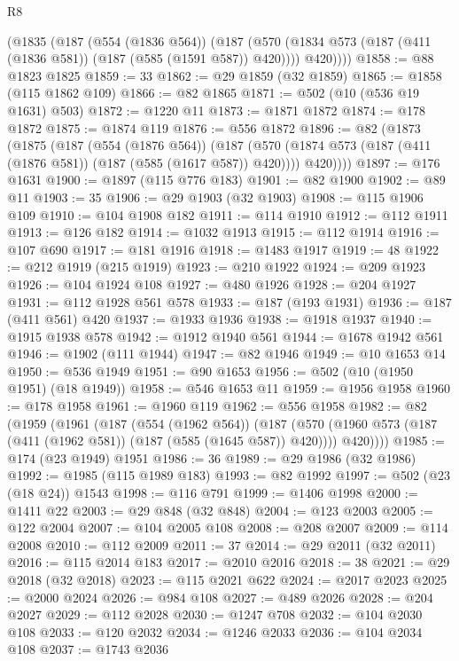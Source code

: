 \begin{lexlean}{R8}
\begin{coremodule}
      (@1835
        (@187
          (@554 (@1836 @564))
          (@187
            (@570 (@1834 @573 (@187 (@411 (@1836 @581)) (@187 (@585 (@1591 @587)) @420))))
            @420))))
@1858 := @88 @1823 @1825
@1859 := 33
@1862 := @29 @1859 (@32 @1859)
@1865 := @1858 (@115 @1862 @109)
@1866 := @82 @1865
@1871 := @502 (@10 (@536 @19 @1631) @503)
@1872 := @1220 @11
@1873 := @1871 @1872
@1874 := @178 @1872
@1875 := @1874 @119
@1876 := @556 @1872
@1896 := @82
    (@1873
      (@1875
        (@187
          (@554 (@1876 @564))
          (@187
            (@570 (@1874 @573 (@187 (@411 (@1876 @581)) (@187 (@585 (@1617 @587)) @420))))
            @420))))
@1897 := @176 @1631
@1900 := @1897 (@115 @776 @183)
@1901 := @82 @1900
@1902 := @89 @11
@1903 := 35
@1906 := @29 @1903 (@32 @1903)
@1908 := @115 @1906 @109
@1910 := @104 @1908 @182
@1911 := @114 @1910
@1912 := @112 @1911
@1913 := @126 @182
@1914 := @1032 @1913
@1915 := @112 @1914
@1916 := @107 @690
@1917 := @181 @1916
@1918 := @1483 @1917
@1919 := 48
@1922 := @212 @1919 (@215 @1919)
@1923 := @210 @1922
@1924 := @209 @1923
@1926 := @104 @1924 @108
@1927 := @480 @1926
@1928 := @204 @1927
@1931 := @112 @1928 @561 @578
@1933 := @187 (@193 @1931)
@1936 := @187 (@411 @561) @420
@1937 := @1933 @1936
@1938 := @1918 @1937
@1940 := @1915 @1938 @578
@1942 := @1912 @1940 @561
@1944 := @1678 @1942 @561
@1946 := @1902 (@111 @1944)
@1947 := @82 @1946
@1949 := @10 @1653 @14
@1950 := @536 @1949
@1951 := @90 @1653
@1956 := @502 (@10 (@1950 @1951) (@18 @1949))
@1958 := @546 @1653 @11
@1959 := @1956 @1958
@1960 := @178 @1958
@1961 := @1960 @119
@1962 := @556 @1958
@1982 := @82
    (@1959
      (@1961
        (@187
          (@554 (@1962 @564))
          (@187
            (@570 (@1960 @573 (@187 (@411 (@1962 @581)) (@187 (@585 (@1645 @587)) @420))))
            @420))))
@1985 := @174 (@23 @1949) @1951
@1986 := 36
@1989 := @29 @1986 (@32 @1986)
@1992 := @1985 (@115 @1989 @183)
@1993 := @82 @1992
@1997 := @502 (@23 (@18 @24)) @1543
@1998 := @116 @791
@1999 := @1406 @1998
@2000 := @1411 @22
@2003 := @29 @848 (@32 @848)
@2004 := @123 @2003
@2005 := @122 @2004
@2007 := @104 @2005 @108
@2008 := @208 @2007
@2009 := @114 @2008
@2010 := @112 @2009
@2011 := 37
@2014 := @29 @2011 (@32 @2011)
@2016 := @115 @2014 @183
@2017 := @2010 @2016
@2018 := 38
@2021 := @29 @2018 (@32 @2018)
@2023 := @115 @2021 @622
@2024 := @2017 @2023
@2025 := @2000 @2024
@2026 := @984 @108
@2027 := @489 @2026
@2028 := @204 @2027
@2029 := @112 @2028
@2030 := @1247 @708
@2032 := @104 @2030 @108
@2033 := @120 @2032
@2034 := @1246 @2033
@2036 := @104 @2034 @108
@2037 := @1743 @2036

\end{coremodule}
\end{lexlean}
